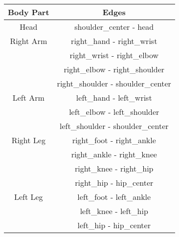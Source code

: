 \begin{table}[H]
    \centering
    \renewcommand{\arraystretch}{1.2}
    \begin{subtable}{\textwidth}
        \centering
        \begin{tabular}{||c||c||}
            \hline
            \textbf{Body Part} & \textbf{Edges} \\
            \hline
            Head & shoulder\_center - head \\
            \hline
            Right Arm & right\_hand - right\_wrist \\
            & right\_wrist - right\_elbow \\
            & right\_elbow - right\_shoulder \\
            & right\_shoulder - shoulder\_center \\
            \hline
            Left Arm & left\_hand - left\_wrist \\
            & left\_elbow - left\_shoulder \\
            & left\_shoulder - shoulder\_center \\
            \hline
            Right Leg & right\_foot - right\_ankle \\
            & right\_ankle - right\_knee \\
            & right\_knee - right\_hip \\
            & right\_hip - hip\_center \\
            \hline
            Left Leg & left\_foot - left\_ankle \\
            & left\_knee - left\_hip \\
            & left\_hip - hip\_center \\
            \hline
        \end{tabular}
        \caption{}
        \label{tab:ml_division_5_body_parts}
    \end{subtable}

    \vspace{10pt} %


\end{table}
